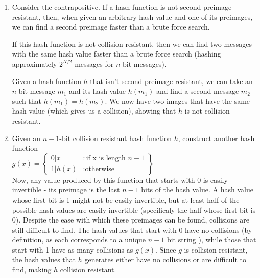 
\begin{enumerate}
\item Consider the contrapositive. If a hash function is not second-preimage
  resistant, then, when given an arbitrary hash value and one of its preimages,
  we can find a second preimage faster than a brute force
  search.

If this hash function is not collision resistant, then we can find two
messages with the same hash value faster than a brute force search (hashing
approximately $2^{N/2}$ messages for $n$-bit messages).

Given a hash function $h$ that isn't second preimage resistant, we can take
an $n$-bit message $m_1$ and its hash value $h(m_1)$ and find a second
message $m_2$ such that $h(m_1) = h(m_2)$. We now have two images that have
the same hash value (which gives us a collision), showing that $h$ is not
collision resistant.

\item Given an $n-1$-bit collision resistant hash function $h$, construct
  another hash function \\
  $g(x) = \left\{
    \begin{array}{lr}
      0|x & : \text{if x is length }n-1\\
      1|h(x) & : \text{otherwise}
    \end{array}
    \right\}$ \\

Now, any value produced by this function that starts with 0 is easily
invertible - its preimage is the last $n-1$ bits of the hash value. A hash
value whose first bit is 1 might not be easily invertible, but at least half
of the possible hash values are easily invertible (specificaly the half whose
first bit is 0). Despite the ease with which these preimages can be found,
collisions are still difficult to find. The hash values that start with 0 have
no collisions (by definition, as each corresponds to a unique $n-1$ bit string
), while those that start with 1 have as many collisions as $g(x)$. Since $g$ is
collision resistant, the hash values that $h$ generates either have no
collisions or are difficult to find, making $h$ collision resistant.


\end{enumerate}
